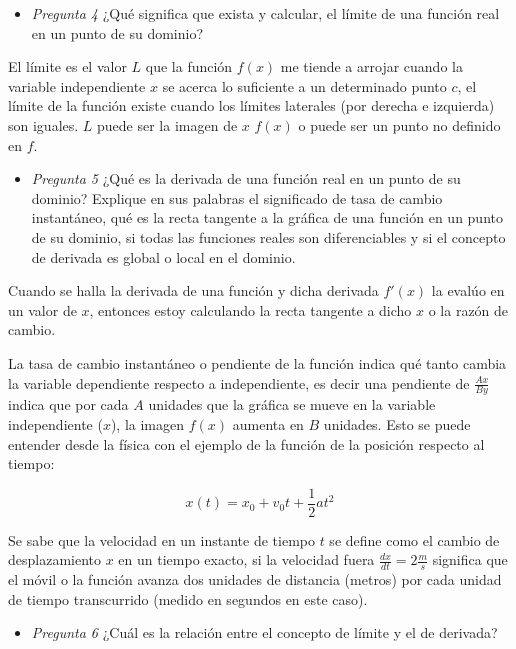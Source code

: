 \begin{itemize}
    \item \textit{Pregunta 4} ¿Qué significa que exista y calcular, el límite de una función real en un punto de su dominio?
\end{itemize}

El límite es el valor $L$ que la función $f(x)$ me tiende a arrojar cuando la variable independiente $x$ se acerca lo suficiente a un determinado punto $c$, el límite de la función existe cuando los límites laterales (por derecha e izquierda) son iguales. $L$ puede ser la imagen de $x$ $f(x)$ o puede ser un punto no definido en $f$.

\begin{itemize}
    \item \textit{Pregunta 5} ¿Qué es la derivada de una función real en un punto de su dominio? Explique en sus palabras el significado de tasa de cambio instantáneo, qué es la recta tangente a la gráfica de una función en un punto de su dominio, si todas las funciones reales son diferenciables y si el concepto de derivada es global o local en el dominio.
\end{itemize}

Cuando se halla la derivada de una función y dicha derivada $f'(x)$ la evalúo en un valor de $x$, entonces estoy calculando la recta tangente a dicho $x$ o la razón de cambio.

La tasa de cambio instantáneo o pendiente de la función indica qué tanto cambia la variable dependiente respecto a independiente, es decir una pendiente de $\frac{Ax}{By}$ indica que por cada $A$ unidades que la gráfica se mueve en la variable independiente ($x$), la imagen $f(x)$ aumenta en $B$ unidades. Esto se puede entender desde la física con el ejemplo de la función de la posición respecto al tiempo:

\begin{equation}
    x(t) = x_0 + v_0 t + \frac{1}{2} a t^2
    \label{eq:movimiento_variado}
\end{equation}

Se sabe que la velocidad en un instante de tiempo $t$ se define como el cambio de desplazamiento $x$ en un tiempo exacto, si la velocidad fuera $\frac{dx}{dt} = 2 \frac{m}{s}$ significa que el móvil o la función avanza dos unidades de distancia (metros) por cada unidad de tiempo transcurrido (medido en segundos en este caso).

\begin{itemize}
    \item \textit{Pregunta 6} ¿Cuál es la relación entre el concepto de límite y el de derivada?
\end{itemize}

